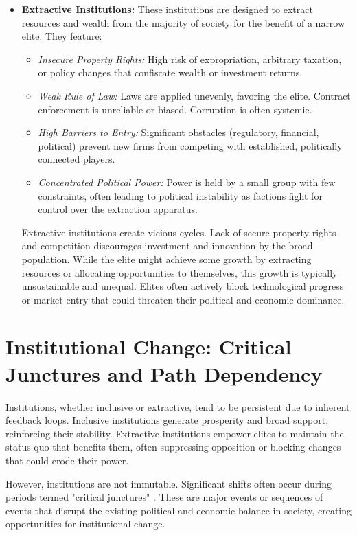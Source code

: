 \begin{itemize}
    \item \textbf{Extractive Institutions:} These institutions are designed to extract resources and wealth from the majority of society for the benefit of a narrow elite. They feature:
          \begin{itemize}
              \item \textit{Insecure Property Rights:} High risk of expropriation, arbitrary taxation, or policy changes that confiscate wealth or investment returns.
              \item \textit{Weak Rule of Law:} Laws are applied unevenly, favoring the elite. Contract enforcement is unreliable or biased. Corruption is often systemic.
              \item \textit{High Barriers to Entry:} Significant obstacles (regulatory, financial, political) prevent new firms from competing with established, politically connected players.
              \item \textit{Concentrated Political Power:} Power is held by a small group with few constraints, often leading to political instability as factions fight for control over the extraction apparatus.
          \end{itemize}
          Extractive institutions create vicious cycles. Lack of secure property rights and competition discourages investment and innovation by the broad population. While the elite might achieve some growth by extracting resources or allocating opportunities to themselves, this growth is typically unsustainable and unequal. Elites often actively block technological progress or market entry that could threaten their political and economic dominance.
\end{itemize}

\section{Institutional Change: Critical Junctures and Path Dependency}
\label{sec:institutional_change}

Institutions, whether inclusive or extractive, tend to be persistent due to inherent feedback loops. Inclusive institutions generate prosperity and broad support, reinforcing their stability. Extractive institutions empower elites to maintain the status quo that benefits them, often suppressing opposition or blocking changes that could erode their power.

However, institutions are not immutable. Significant shifts often occur during periods termed "critical junctures" \parencite{acemoglu2012nations}. These are major events or sequences of events that disrupt the existing political and economic balance in society, creating opportunities for institutional change. 

